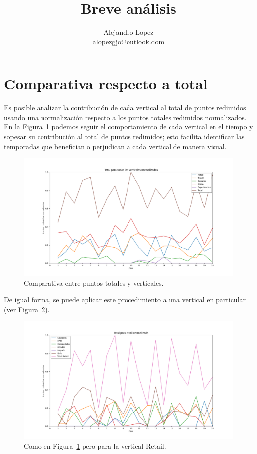 \documentclass[a4,notitlepage,12pt,spanish]{jedm}
\begin{document}
\title{Breve an\'alisis}
\date{}

\author{{\large Alejandro Lopez}\\alopezgjo@outlook.dom }

\maketitle


\section{Comparativa respecto a total} \label{sec:comparativa}

Es posible analizar la contribuci\'on de cada vertical al total de puntos redimidos usando una normalizaci\'on respecto a los puntos totales redimidos normalizados. En la Figura~\ref{fig:total} podemos seguir el comportamiento de cada vertical en el tiempo y sopesar su contribuci\'on al total de puntos redimidos; esto facilita identificar las temporadas que benefician o perjudican a cada vertical de manera visual.

\begin{figure}[!htb]
\centering
\includegraphics[scale=0.5]{total}
\caption{Comparativa entre puntos totales y verticales.}
\label{fig:total}
\end{figure}

De igual forma, se puede aplicar este procedimiento a una vertical en particular (ver Figura~\ref{fig:retail}).

\begin{figure}[!htb]
\centering
\includegraphics[scale=0.5]{retail}
\caption{Como en Figura~\ref{fig:total} pero para la vertical Retail.}
\label{fig:retail}
\end{figure}
\end{document}
